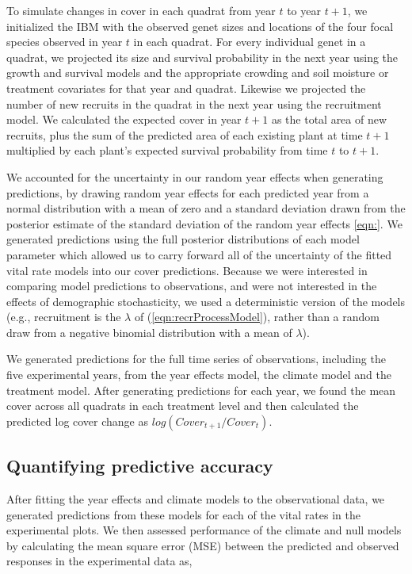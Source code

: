 \documentclass[11pt]{article}
\begin{document}
\begin{doublespacing}
To simulate changes in cover in each quadrat from year $t$ to year $t+1$, we initialized the IBM with the observed genet sizes and locations of the four focal species observed in year $t$ in each quadrat. For every individual genet in a quadrat, we projected its size and survival probability in the next year using the growth and survival models and the appropriate crowding and soil moisture or treatment covariates for that year and quadrat.  Likewise we projected the number of new recruits in the quadrat in the next year using the recruitment model. We calculated the expected cover in year $t+1$ as the total area of new recruits, plus the sum of the predicted area of each existing plant at time $t+1$ multiplied by each plant's expected survival probability from time $t$ to $t+1$. 

We accounted for the uncertainty in our random year effects when generating predictions, by drawing random year effects for each predicted year from a normal distribution with a mean of zero and a standard deviation drawn from the posterior estimate of the standard deviation of the random year effects \ref{eqn:}. We generated predictions using the full posterior distributions of each model parameter which allowed us to carry forward all of the uncertainty of the fitted vital rate models into our cover predictions. Because we were interested in comparing model predictions to observations, and were not interested in the effects of demographic stochasticity, we used a deterministic version of the models (e.g., recruitment is the $\lambda$ of (\ref{eqn:recrProcessModel}), rather than a random draw from a negative binomial distribution with a mean of $\lambda$).

We generated predictions for the full time series of observations, including the five experimental years, from the year effects model, the climate model and the treatment model. After generating predictions for each year, we found the mean cover across all quadrats in each treatment level and then calculated the predicted log cover change as $log(Cover_{t+1}/Cover_{t})$.

\subsection*{Quantifying predictive accuracy} 
After fitting the year effects and climate models to the observational data, we generated predictions from these models for each of the vital rates in the experimental plots. We then assessed performance of the climate and null models by calculating the mean square error (MSE) between the predicted and observed responses in the experimental data as, 


\end{doublespacing}
\end{document}
